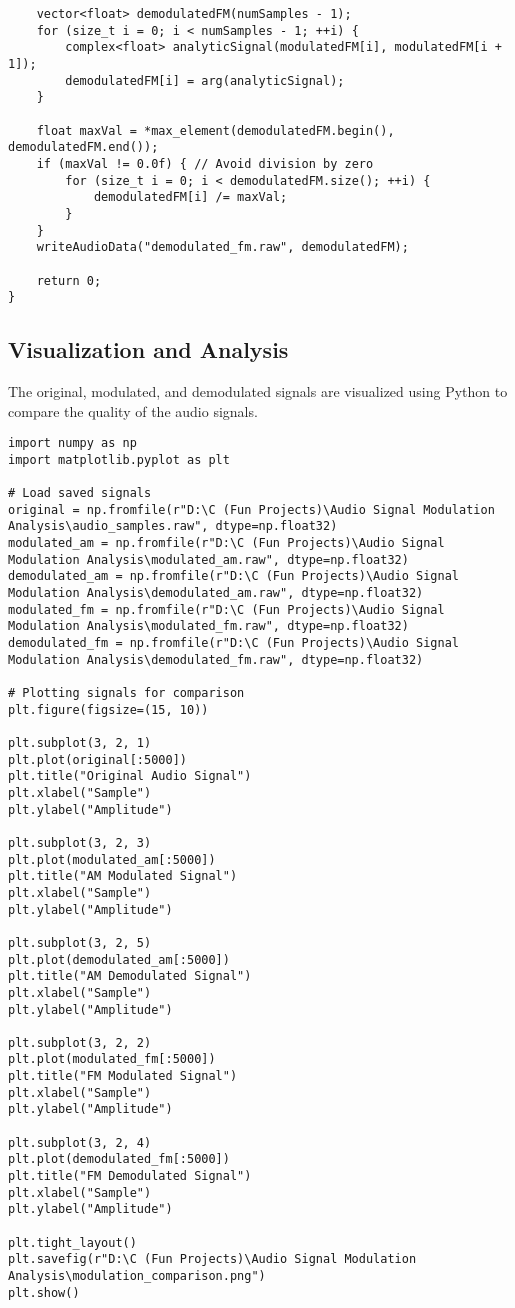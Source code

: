 \documentclass{article}
\begin{document}
\begin{verbatim}
    vector<float> demodulatedFM(numSamples - 1);
    for (size_t i = 0; i < numSamples - 1; ++i) {
        complex<float> analyticSignal(modulatedFM[i], modulatedFM[i + 1]);
        demodulatedFM[i] = arg(analyticSignal);
    }

    float maxVal = *max_element(demodulatedFM.begin(), demodulatedFM.end());
    if (maxVal != 0.0f) { // Avoid division by zero
        for (size_t i = 0; i < demodulatedFM.size(); ++i) {
            demodulatedFM[i] /= maxVal;
        }
    }
    writeAudioData("demodulated_fm.raw", demodulatedFM);

    return 0;
}
\end{verbatim}

\subsection{Visualization and Analysis}
The original, modulated, and demodulated signals are visualized using Python to compare the quality of the audio signals.

\begin{verbatim}
import numpy as np
import matplotlib.pyplot as plt

# Load saved signals
original = np.fromfile(r"D:\C (Fun Projects)\Audio Signal Modulation Analysis\audio_samples.raw", dtype=np.float32)
modulated_am = np.fromfile(r"D:\C (Fun Projects)\Audio Signal Modulation Analysis\modulated_am.raw", dtype=np.float32)
demodulated_am = np.fromfile(r"D:\C (Fun Projects)\Audio Signal Modulation Analysis\demodulated_am.raw", dtype=np.float32)
modulated_fm = np.fromfile(r"D:\C (Fun Projects)\Audio Signal Modulation Analysis\modulated_fm.raw", dtype=np.float32)
demodulated_fm = np.fromfile(r"D:\C (Fun Projects)\Audio Signal Modulation Analysis\demodulated_fm.raw", dtype=np.float32)

# Plotting signals for comparison
plt.figure(figsize=(15, 10))

plt.subplot(3, 2, 1)
plt.plot(original[:5000])
plt.title("Original Audio Signal")
plt.xlabel("Sample")
plt.ylabel("Amplitude")

plt.subplot(3, 2, 3)
plt.plot(modulated_am[:5000])
plt.title("AM Modulated Signal")
plt.xlabel("Sample")
plt.ylabel("Amplitude")

plt.subplot(3, 2, 5)
plt.plot(demodulated_am[:5000])
plt.title("AM Demodulated Signal")
plt.xlabel("Sample")
plt.ylabel("Amplitude")

plt.subplot(3, 2, 2)
plt.plot(modulated_fm[:5000])
plt.title("FM Modulated Signal")
plt.xlabel("Sample")
plt.ylabel("Amplitude")

plt.subplot(3, 2, 4)
plt.plot(demodulated_fm[:5000])
plt.title("FM Demodulated Signal")
plt.xlabel("Sample")
plt.ylabel("Amplitude")

plt.tight_layout()
plt.savefig(r"D:\C (Fun Projects)\Audio Signal Modulation Analysis\modulation_comparison.png")
plt.show()

\end{verbatim}
\end{document}
